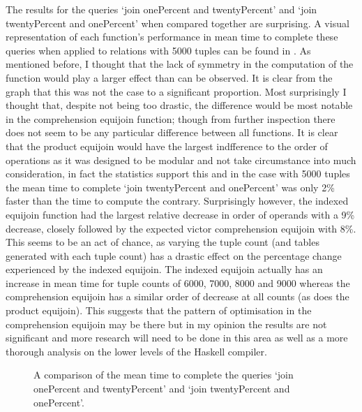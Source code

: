 The results for the queries `join onePercent and twentyPercent' and `join
twentyPercent and onePercent' when compared together are surprising. A visual
representation of each function's performance in mean time to complete these
queries when applied to relations with 5000 tuples can be found in 
. As mentioned before,
I thought that the lack of symmetry in the computation of the function would
play a larger effect than can be observed. It is clear from the graph that this
was not the case to a significant proportion. Most surprisingly I thought that,
despite not being too drastic, the difference would be most notable in the
comprehension equijoin function; though from further inspection there does not
seem to be any particular difference between all functions. It is clear that the
product equijoin would have the largest indfference to the order of operations
as it was designed to be modular and not take circumstance into much
consideration, in fact the statistics support this and in the case with 5000
tuples the mean time to complete `join twentyPercent and onePercent' was only
2\% faster than the time to compute the contrary. Surprisingly however, the
indexed equijoin function had the largest relative decrease in order of operands
with a 9\% decrease, closely followed by the expected victor comprehension
equijoin with 8\%. This seems to be an act of chance, as varying the tuple count
(and tables generated with each tuple count) has a drastic effect on the
percentage change experienced by the indexed equijoin. The indexed equijoin
actually has an increase in mean time for tuple counts of 6000, 7000, 8000 and
9000 whereas the comprehension equijoin has a similar order of decrease at all
counts (as does the product equijoin). This suggests that the pattern of
optimisation in the comprehension equijoin may be there but in my opinion the
results are not significant and more research will need to be done in this area
as well as a more thorough analysis on the lower levels of the Haskell compiler.

\begin{figure}[p]
    
    \caption{A comparison of the mean time to complete the queries `join
    onePercent and twentyPercent' and `join twentyPercent and onePercent'.}
    \label{fig:benchmark:onePercent-twentyPercent-flipped-5000}
\end{figure}

